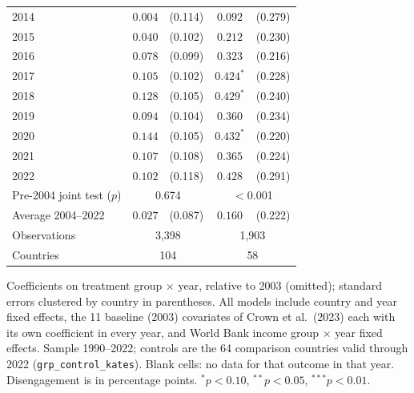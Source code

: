 \begin{table}[htbp]
\begin{tabular}{lcccc}
2014 & $0.004$ & (0.114) & $0.092$ & (0.279) \\
2015 & $0.040$ & (0.102) & $0.212$ & (0.230) \\
2016 & $0.078$ & (0.099) & $0.323$ & (0.216) \\
2017 & $0.105$ & (0.102) & $0.424^{*}$ & (0.228) \\
2018 & $0.128$ & (0.105) & $0.429^{*}$ & (0.240) \\
2019 & $0.094$ & (0.104) & $0.360$ & (0.234) \\
2020 & $0.144$ & (0.105) & $0.432^{*}$ & (0.220) \\
2021 & $0.107$ & (0.108) & $0.365$ & (0.224) \\
2022 & $0.102$ & (0.118) & $0.428$ & (0.291) \\
\midrule
Pre-2004 joint test ($p$) & \multicolumn{2}{c}{0.674} & \multicolumn{2}{c}{$<$0.001} \\
Average 2004--2022 & $0.027$ & (0.087) & $0.160$ & (0.222) \\
Observations & \multicolumn{2}{c}{3,398} & \multicolumn{2}{c}{1,903} \\
Countries & \multicolumn{2}{c}{104} & \multicolumn{2}{c}{58} \\
\bottomrule
\end{tabular}
\par\vspace{4pt}
\begin{minipage}{\textwidth}\footnotesize Coefficients on treatment group $\times$ year, relative to 2003 (omitted); standard errors clustered by country in parentheses. All models include country and year fixed effects, the 11 baseline (2003) covariates of Crown et al.\ (2023) each with its own coefficient in every year, and World Bank income group $\times$ year fixed effects. Sample 1990--2022; controls are the 64 comparison countries valid through 2022 (\texttt{grp\_control\_kates}). Blank cells: no data for that outcome in that year. Disengagement is in percentage points. $^{*}p<0.10$, $^{**}p<0.05$, $^{***}p<0.01$.\end{minipage}
\end{table}

